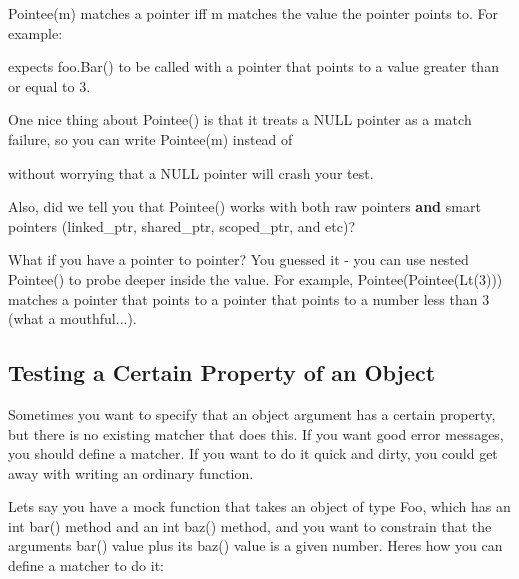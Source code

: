 {\ttfamily Pointee(m)} matches a pointer iff {\ttfamily m} matches the value the pointer points to. For example\+:


\begin{DoxyCode}{0}
\end{DoxyCode}


expects {\ttfamily foo.\+Bar()} to be called with a pointer that points to a value greater than or equal to 3.

One nice thing about {\ttfamily Pointee()} is that it treats a {\ttfamily N\+U\+LL} pointer as a match failure, so you can write {\ttfamily Pointee(m)} instead of


\begin{DoxyCode}{0}
\end{DoxyCode}


without worrying that a {\ttfamily N\+U\+LL} pointer will crash your test.

Also, did we tell you that {\ttfamily Pointee()} works with both raw pointers {\bfseries and} smart pointers ({\ttfamily linked\+\_\+ptr}, {\ttfamily shared\+\_\+ptr}, {\ttfamily scoped\+\_\+ptr}, and etc)?

What if you have a pointer to pointer? You guessed it -\/ you can use nested {\ttfamily Pointee()} to probe deeper inside the value. For example, {\ttfamily Pointee(Pointee(\+Lt(3)))} matches a pointer that points to a pointer that points to a number less than 3 (what a mouthful...).

\subsection*{Testing a Certain Property of an Object}

Sometimes you want to specify that an object argument has a certain property, but there is no existing matcher that does this. If you want good error messages, you should define a matcher. If you want to do it quick and dirty, you could get away with writing an ordinary function.

Let\textquotesingle{}s say you have a mock function that takes an object of type {\ttfamily Foo}, which has an {\ttfamily int bar()} method and an {\ttfamily int baz()} method, and you want to constrain that the argument\textquotesingle{}s {\ttfamily bar()} value plus its {\ttfamily baz()} value is a given number. Here\textquotesingle{}s how you can define a matcher to do it\+:


